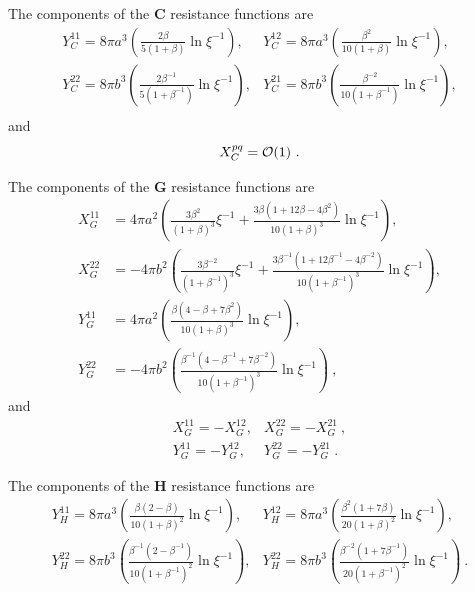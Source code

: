 \documentclass[reprint, amsmath,amssymb,aps,pre,onecolumn,notitlepage%
]{revtex4-1}
\begin{document}
The components of the $\bm{C}$ resistance functions are
\begin{equation}
\begin{split}
Y_C^{11}= 8 \pi a^3 \left(\frac{2\beta}{5 (1+\beta)} \ln{\xi^{-1}} \right),& Y_C^{12}= 8 \pi a^3 \left(\frac{\beta^2}{10 (1+\beta)} \ln{\xi^{-1}} \right),\\
Y_C^{22}= 8 \pi b^3 \left(\frac{2\beta^{-1}}{5 (1+\beta^{-1})} \ln{\xi^{-1}} \right),& Y_C^{21}= 8 \pi b^3 \left(\frac{\beta^{-2}}{10 (1+\beta^{-1})} \ln{\xi^{-1}} \right),\\
\end{split}
\end{equation}
and 
\begin{equation}
	X^{pq}_C =\mathcal{O}(1)\ .\\
\end{equation}


The components of the $\bm{G}$ resistance functions are
\begin{equation}
\begin{split}
	X_G^{11}&= 4 \pi a^2 \left( \frac{3 \beta^2}{(1+\beta)^3}\xi^{-1} + \frac{3 \beta (1+ 12 \beta - 4 \beta^2)}{10 (1+\beta)^3} \ln{\xi^{-1}}\right),\\
	X_G^{22}&= -4 \pi b^2 \left( \frac{3 \beta^{-2}}{(1+\beta^{-1})^3}\xi^{-1} + \frac{3 \beta^{-1} (1+ 12 \beta^{-1} - 4 \beta^{-2})}{10 (1+\beta^{-1})^3} \ln{\xi^{-1}}\right),\\
	Y_G^{11}&= 4 \pi a^2 \left(\frac{ \beta (4 - \beta + 7\beta^2)}{10 (1+\beta)^3} \ln{\xi^{-1}} \right),\\
	Y_G^{22}&= -4 \pi b^2 \left(\frac{ \beta^{-1} (4 -  \beta^{-1} + 7\beta^{-2})}{10 (1+\beta^{-1})^3} \ln{\xi^{-1}} \right)\ ,
\end{split}
\end{equation}
and 
\begin{equation}
\begin{split}
	X^{11}_G =-X^{12}_G, & X^{22}_G =-X^{21}_G\ ,\\
	Y^{11}_G =-Y^{12}_G, & Y^{22}_G =-Y^{21}_G \ .
\end{split}
\end{equation}


The components of the $\bm{H}$ resistance functions are
\begin{equation}
\begin{split}
Y_H^{11}= 8 \pi a^3 \left(\frac{\beta(2-\beta)}{10 (1+\beta)^2} \ln{\xi^{-1}} \right),& Y_H^{12}= 8 \pi a^3 \left(\frac{\beta^2(1+7\beta)}{20 (1+\beta)^2} \ln{\xi^{-1}} \right),\\
Y_H^{22}= 8 \pi b^3 \left(\frac{\beta^{-1}(2-\beta^{-1})}{10 (1+\beta^{-1})^2} \ln{\xi^{-1}} \right),& Y_H^{22}= 8 \pi b^3 \left(\frac{\beta^{-2}(1+7\beta^{-1})}{20 (1+\beta^{-1})^2} \ln{\xi^{-1}} \right)\ .
\end{split}
\end{equation}
\end{document}
